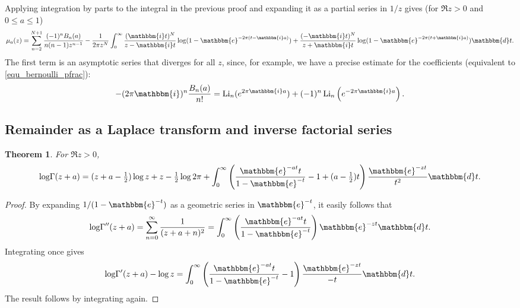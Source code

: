 \documentclass[12pt]{article}
\newcommand{\ee}[0] {\mathbbm{e}}
\newcommand{\ii}[0] {\mathbbm{i}}
\newcommand{\dd}[0] {\mathbbm{d}}
\newcommand{\op}[1]  { \operatorname{ #1 }}
\newcommand{\logG} {\operatorname {log \Gamma}}
\numberwithin{equation}{section}
\newtheorem{theorem}{Theorem}[section]
\begin{document}
Applying integration by parts to the integral in the previous proof and expanding it as a partial series in $1/z$ gives (for $\Re z > 0$ and $0 \le a \le 1$)
\begin{equation*}
\mu_a(z) = \sum_{n=2}^{N+1} \frac{(-1)^n B_n(a)}{n(n-1) z^{n-1}} - \frac{1}{2\pi z^N} \int_{0}^{\infty} \frac{(\ii t)^N}{z - \ii t} \log(1-\ee^{-2\pi(t-\ii a)}) + \frac{(-\ii t)^N}{z + \ii t} \log(1-\ee^{-2\pi(t+\ii a)}) \dd t\text{.}
\end{equation*}
The first term is an asymptotic series that diverges for all $z$, since, for example, we have a precise estimate for the coefficients (equivalent to \eqref{equ_bernoulli_pfrac}):
\begin{equation*}
- (2 \pi \ii)^{n} \frac{B_n(a)}{n!}= \op{Li}_n (e^{2 \pi \ii a}) + (-1)^n \op{Li}_n\left(e^{-2 \pi \ii a}\right)\text{.}
\end{equation*}


\subsection{Remainder as a Laplace transform and inverse factorial series}
\begin{theorem}
For $\Re z > 0$,
\begin{align*}
\logG (z+a) = (z+a-\tfrac{1}{2}) \log z + z - \tfrac{1}{2} \log 2\pi + \int_0^{\infty} \left( \frac{ \ee^{-at}t}{1-\ee^{-t}}-1+(a-\tfrac{1}{2})t \right) \frac{\ee^{-z t}}{t^2} \dd t \text{.}
\end{align*}
\end{theorem}
\begin{proof}
By expanding $1/(1-\ee^{-t})$ as a geometric series in $\ee^{-t}$, it easily follows that
\begin{equation*}
\logG''(z+a) = \sum_{n=0}^{\infty}\frac{1}{(z+a+n)^2} = \int_0^{\infty} \left( \frac{ \ee^{-at}t}{1-\ee^{-t}}\right) \ee^{-z t} \dd t\text{.}
\end{equation*}
Integrating once gives
\begin{equation}
\label{equ_loggamma_laplace}
\logG'(z+a) - \log z = \int_0^{\infty} \left( \frac{ \ee^{-at}t}{1-\ee^{-t}}-1\right) \frac{\ee^{-z t}}{-t} \dd t\text{.}
\end{equation}
The result follows by integrating again.
\end{proof}
\end{document}
